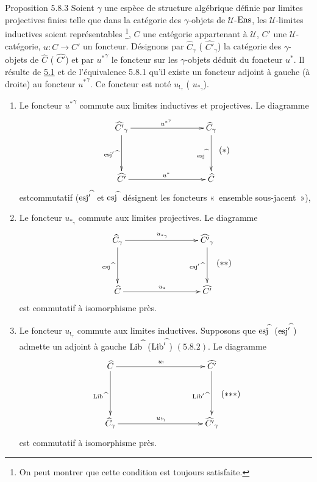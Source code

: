 \documentclass[10pt]{../fichiers-configuration-latex/smfart}
\begin{document}
\begin{enonce*}{Proposition 5.8.3}
Soient $\gamma$ une espèce de structure algébrique définie par
limites projectives finies telle que dans la catégorie des
$\gamma$-objets de $𝒰$-$\operatorname{Ens}$, les $𝒰$-limites
inductives soient représentables \footnote[2]{On peut montrer que
cette condition est
  toujours satisfaite.}, $C$ une catégorie appartenant à $𝒰$,
$C'$ une $𝒰$-catégorie, $u:C\rightarrow C'$ un foncteur.
Désignons par $\widehat{C}_\gamma$ (\resp
$\widehat{C'}_\gamma$) la catégorie des
$\gamma$-objets de $\widehat{C}$ (\resp
$\widehat{C'}$) et par ${u^\ast}^\gamma$ le foncteur
sur les $\gamma$-objets déduit du foncteur $u^\ast$. Il résulte de
\hyperref[I.prop5.1]{5.1}  et de l'équivalence 5.8.1 qu'il existe un
foncteur adjoint à gauche (\resp  à droite) au foncteur
${u^\ast}^\gamma$. Ce foncteur est noté $u_{!_\gamma}$ (\resp
$u_{\ast_\gamma}$).
\begin{enumerate}
\item Le foncteur ${u^\ast}^\gamma$ commute aux limites inductives et
  projectives. Le diagramme
\[\vcenter{
\xymatrix@C=3cm@R=1.5cm{
 \widehat{C'}_\gamma \ar[r]^{u^{\ast^{\gamma}}} \ar[d]_{\esj'\widehat{\phantom{a}}}&
\widehat{C}_\gamma  \ar[d]_{\esj^{\widehat{\phantom{a}}}}\\
 \widehat{C'} \ar[r]^{u^{\ast}}& \widehat{C}
}}\leqno{(*)}
\]
est\pageoriginale commutatif (${\operatorname{esj}'}^{\widehat{\phantom{,}}}$ et
$\operatorname{esj}^{\widehat{\phantom{,}}}$ désignent les foncteurs « ensemble
sous-jacent »),

\item Le foncteur $u_{\ast_\gamma}$ commute aux limites projectives. Le
  diagramme
\[\vcenter{
\xymatrix@C=3cm@R=1.5cm{
 \widehat{C}_\gamma \ar[r]^{u_{\ast_\gamma}} \ar[d]_{\esj\widehat{\phantom{a}}}&
  \widehat{C'}_\gamma\ar[d]_{\esj'\widehat{\phantom{a}}}\\
\widehat{C} \ar[r]^{u_{\ast}}&
\widehat{C'} }}\leqno{({*}{*})}
\]
est commutatif à isomorphisme près.

\item Le foncteur $u_{!_\gamma}$ commute aux limites inductives. Supposons
  que $\operatorname{esj}^{\widehat{\phantom{,}}}$
  (\resp  ${\operatorname{esj}'}^{\widehat{\phantom{,}}}$) admette un adjoint à
  gauche $\operatorname{Lib}^{\widehat{\phantom{,}}}$
  (\resp  ${\operatorname{Lib}'}^{\widehat{\phantom{,}}}$) $(5.8.2)$. Le diagramme
\[\vcenter{
\xymatrix@C=3.5cm@R=1.75cm{
 \widehat{C} \ar[r]^{u_{!}} \ar[d]_{\Lib\widehat{\phantom{a}}}&
  \widehat{C'} \ar[d]_{\Lib'\widehat{\phantom{a}}}\\
\widehat{C}_{\gamma} \ar[r]^{u_{!\gamma}} &
\widehat{C'}_{\gamma} }}\leqno{({*}{*}{*})}
\]
est commutatif à isomorphisme près.
\end{enumerate}


\end{enonce*}
\end{document}
